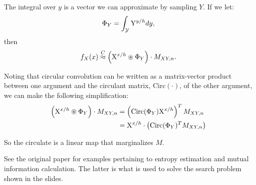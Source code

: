 \documentclass[10pt,letterpaper,oneside]{article}
\newcommand{\bind}{\circledast}
\newcommand{\analog}{\overset{C}{\approx}}
\newcommand{\domain}[1]{\mathcal{#1}}
\newcommand{\ssp}[1]{\mathrm{\uppercase{#1}}^{\lowercase{#1}/h}}
\begin{document}
The integral over $y$ is a vector we can approximate by sampling $Y$. If we let:
\begin{align}
  \Phi_{Y} = \int_{\domain{Y}}\ssp{Y}dy\text{,}
\end{align}
then
\begin{align}
  f_{X}(x) \analog \left(\ssp{X}\bind\Phi_{Y}\right) \cdot M_{XY,n}.
\end{align}

Noting that circular convolution can be written as a matrix-vector product between one argument and the circulant matrix, $\mathrm{Circ}(\cdot)$, of the other argument, we can make the following simplification:
\begin{align}
  \left(\ssp{X}\bind\Phi_{Y}\right) \cdot M_{XY,n} &= \left(\mathrm{Circ}(\Phi_{Y})\ssp{X}\right)^{T} M_{XY,n}\\
  &= \ssp{X}\cdot\left(\mathrm{Circ}(\Phi_{Y})^{T} M_{XY,n}\right)
\end{align}

So the circulate is a linear map that marginalizes $M$.

See the original paper for examples pertaining to entropy estimation and mutual information calculation.  The latter is what is used to solve the search problem shown in the slides.

\printbibliography
\end{document}
